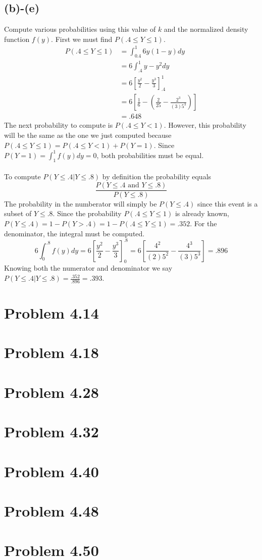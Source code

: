 \documentclass{article}
\theoremstyle{definition}
\begin{document}
    \subsection*{(b)-(e)}
        Compute various probabilities using this value of $k$ and the normalized density function $f(y)$. First
        we must find $P(.4 \leq Y \leq 1)$.
        \begin{align*}
            P(.4 \leq Y \leq 1) &= \int_{0.4}^1 6y(1-y)dy\\
            &= 6 \int_{.4}^1y - y^2dy\\
            &= 6\left[\frac{y^2}{2} - \frac{y^3}{3}\right]_{.4}^1\\
            &= 6 \left[ \frac{1}{6} - \left(\frac{2}{25} - \frac{2^3}{(3) 5^3}\right)   \right]\\
            &= .648
        \end{align*}
        The next probability to compute is $P(.4 \leq Y < 1)$. However, this probability will be the
        same as the one we just computed because $P(.4 \leq Y \leq 1) = P(.4 \leq Y < 1) + P(Y = 1)$.
        Since $P(Y = 1) = \int_1^1 f(y)dy = 0$, both probabilities must be equal. \\\\
        To compute $P(Y \leq .4 | Y \leq .8)$ by definition the probability equals 
        \[
            \frac{P(Y \leq .4 \text { and } Y \leq .8)}{P(Y \leq .8)}
        \]
        The probability in the numberator will simply be $P(Y \leq .4)$ since this event is a subset of $Y \leq .8$.
        Since the probability $P(.4 \leq Y \leq 1)$ is already known, $P(Y \leq .4) = 1 - P(Y > .4) = 1 - P(.4 \leq Y \leq 1) = .352$.
        For the denominator, the integral must be computed.
        \[
            6 \int_0^{.8} f(y) dy = 6\left[\frac{y^2}{2} - \frac{y^3}{3}\right]_0^{.8} = 6\left[\frac{4^2}{(2)5^2} - \frac{4^3}{(3)5^3}\right] = .896
        \]
        Knowing both the numerator and denominator we say $P(Y \leq .4 | Y \leq .8) = \frac{.352}{.896} = .393$.
\section*{Problem 4.14}
\section*{Problem 4.18}
\section*{Problem 4.28}
\section*{Problem 4.32}
\section*{Problem 4.40}
\section*{Problem 4.48}
\section*{Problem 4.50}
\end{document}
